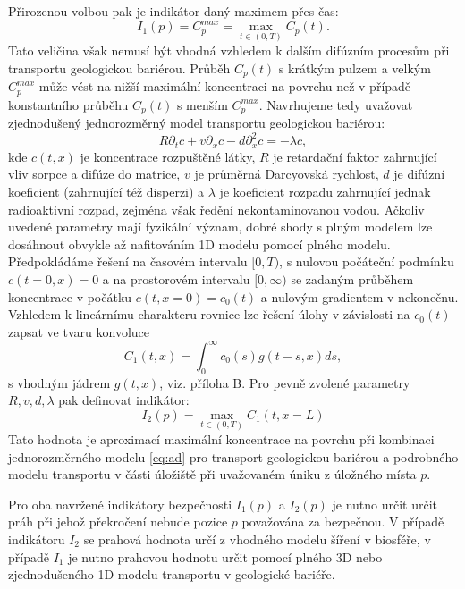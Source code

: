 \documentclass{article}
\begin{document}
Přirozenou volbou pak je indikátor daný maximem přes čas:
\begin{equation}
    I_1(p) = C_p^{max} = \max_{t\in(0, T)} C_p(t).
\end{equation}
Tato veličina však nemusí být vhodná vzhledem k dalším difúzním procesům při transportu geologickou bariérou.
Průběh $C_p(t)$ s krátkým pulzem a velkým $C_p^{max}$ může vést na nižší maximální koncentraci na povrchu než v případě konstantního průběhu $C_p(t)$ s menším  $C_p^{max}$. Navrhujeme tedy uvažovat zjednodušený jednorozměrný model transportu geologickou bariérou:
\begin{equation}
    \label{eq:ad}
    R\partial_t c + v \partial_x c - d \partial^2_x c = - \lambda c,
\end{equation}
kde $c(t,x)$ je koncentrace rozpuštěné látky, $R$ je retardační faktor zahrnující vliv sorpce a difúze do matrice, $v$ je průměrná Darcyovská rychlost, $d$ je difúzní koeficient (zahrnující též disperzi) a $\lambda$ je koeficient rozpadu zahrnující jednak radioaktivní rozpad, zejména však ředění nekontaminovanou vodou. Ačkoliv uvedené parametry mají fyzikální význam, dobré shody s plným modelem lze dosáhnout obvykle až nafitováním 1D modelu pomocí plného modelu.
Předpokládáme řešení na časovém intervalu  $[0, T)$, s nulovou počáteční podmínku $c(t=0, x) = 0$ a na prostorovém intervalu $[0, \infty)$ se zadaným 
průběhem koncentrace v počátku $c(t, x=0) = c_0(t)$ a nulovým gradientem v nekonečnu.
Vzhledem k lineárnímu charakteru rovnice lze řešení úlohy v závislosti na $c_0(t)$ zapsat ve tvaru konvoluce
\begin{equation}
    C_1(t, x) = \int_{0}^\infty c_0(s) g(t - s, x) ds,
\end{equation}
s  vhodným jádrem $g(t, x)$, viz. příloha B. Pro pevně zvolené parametry $R, v, d, \lambda$ pak definovat indikátor:
\begin{equation}
    I_2(p) =  \max_{t\in(0, T)} C_1(t, x=L)
\end{equation}
Tato hodnota je aproximací maximální koncentrace na povrchu
při kombinaci jednorozměrného modelu \ref{eq:ad} pro transport geologickou bariérou a podrobného modelu transportu v části úložiště při uvažovaném úniku z úložného místa $p$. 

Pro oba navržené indikátory bezpečnosti $I_1(p)$ a $I_2(p)$ je nutno určit určit práh při jehož překročení nebude pozice $p$ považována za bezpečnou. V případě indikátoru $I_2$ se prahová hodnota určí z vhodného modelu šíření  v biosféře, v případě $I_1$ je nutno prahovou hodnotu určit pomocí plného 3D nebo zjednodušeného 1D modelu transportu v geologické bariéře.
\end{document}

